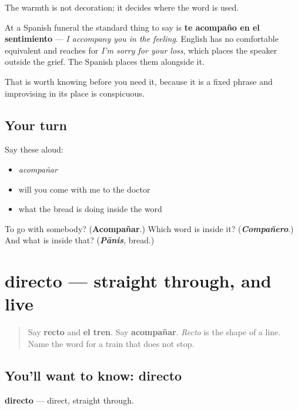 \begin{culture}
The warmth is not decoration; it decides where the word is used.

At a Spanish funeral the standard thing to say is \textbf{te acompaño en el sentimiento} — \emph{I accompany you in the feeling}. English has no comfortable equivalent and reaches for \emph{I'm sorry for your loss}, which places the speaker outside the grief. The Spanish places them alongside it.

That is worth knowing before you need it, because it is a fixed phrase and improvising in its place is conspicuous.
\end{culture}

\subsection*{Your turn}
Say these aloud:

\begin{itemize}
\raggedright
  \item \emph{acompañar}
  \item will you come with me to the doctor
  \item what the bread is doing inside the word
\end{itemize}

\begin{tcolorbox}[breakable,colback=teal!4,colframe=teal!35!black,title={Before you move on}]
To go with somebody? (\textbf{Acompañar}.) Which word is inside it? (\emph{\textbf{Compañero}}.) And what is inside that? (\emph{\textbf{Pānis}}, bread.)
\end{tcolorbox}
\section[directo]{directo — straight through, and live}

\label{lesson:ES-C446-directo}



\begin{quote}
Say \textbf{recto} and \textbf{el tren}. Say \textbf{acompañar}. \emph{Recto} is the shape of a line. Name the word for a train that does not stop.
\end{quote}

\subsection*{You'll want to know: directo}
\textbf{directo} — direct, straight through.

